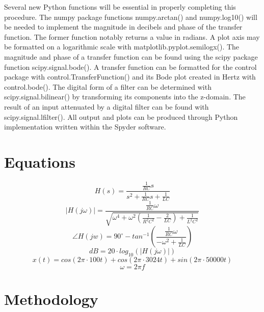 \documentclass[12pt]{report}
\begin{document}
Several new Python functions will be essential in properly completing this procedure. The numpy package functions numpy.arctan() and numpy.log10() will be needed to implement the magnitude in decibels and phase of the transfer function. The former function notably returns a value in radians. A plot axis may be formatted on a logarithmic scale with matplotlib.pyplot.semilogx(). The magnitude and phase of a transfer function can be found using the scipy package function scipy.signal.bode(). A transfer function can be formatted for the control package with control.TransferFunction() and its Bode plot created in Hertz with control.bode(). The digital form of a filter can be determined with scipy.signal.bilinear() by transforming its components into the z-domain. The result of an input attenuated by a digital filter can be found with scipy.signal.lfilter(). All output and plots can be produced through Python implementation written within the Spyder software. \\

\section{Equations}

\begin{equation}
	H(s) = \frac{\frac{1}{RC}s}{s^2 + \frac{1}{RC}s + \frac{1}{LC}}
\end{equation}
\begin{equation}
	|H(j\omega)| = \frac{\frac{1}{RC}\omega}{\sqrt{\omega^4 + \omega^2(\frac{1}{R^2C^2} - \frac{2}{LC}) + \frac{1}{L^2C^2}}}
\end{equation}
\begin{equation}
	\angle H(jw) = 90^\circ - tan^{-1}(\frac{\frac{1}{RC}\omega}{-\omega^2 + \frac{1}{LC}})
\end{equation}
\begin{equation}
	dB = 20\cdot log_{10}(|H(j\omega)|)
\end{equation}
\begin{equation}
	x(t) = cos(2\pi\cdot 100t) + cos(2\pi\cdot 3024t) + sin(2\pi\cdot 50000t)
\end{equation}
\begin{equation}
	\omega = 2\pi f
\end{equation}

\section{Methodology}
\end{document}
